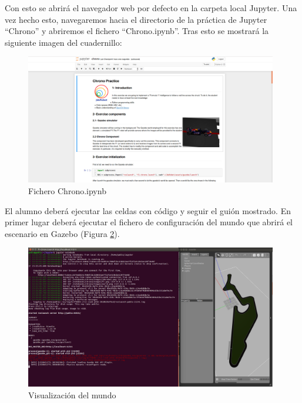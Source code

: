 Con esto se abrirá el navegador web por defecto en la carpeta local Jupyter. Una vez hecho esto, navegaremos hacia el directorio de la práctica de Jupyter ``Chrono'' y abriremos el fichero ``Chrono.ipynb''. Tras esto se mostrará la siguiente imagen del cuadernillo:

\begin{figure}[H]
  \begin{center}
    \includegraphics[width=0.98\textwidth]{figures/ipynb_chrono.png}
		\caption{Fichero Chrono.ipynb}
		\label{fig.fcipynb}
		\end{center}
\end{figure}

El alumno deberá ejecutar las celdas con código y seguir el guión mostrado. En primer lugar deberá ejecutar el fichero de configuración del mundo que abrirá el escenario en Gazebo (Figura \ref{fig.cmdc}).

\begin{figure}[H]
  \begin{center}
    \includegraphics[width=0.98\textwidth]{figures/celda_mundo_chrono.png}
		\caption{Visualización del mundo}
		\label{fig.cmdc}
		\end{center}
\end{figure}

